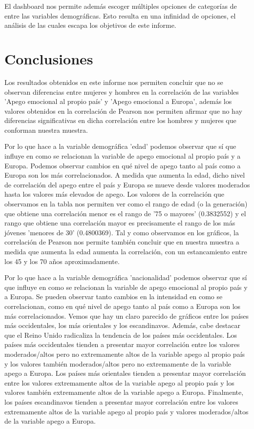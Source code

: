 \documentclass{article}
\begin{document}
\noindent El dashboard nos permite además escoger múltiples opciones de categorías de entre las variables demográficas. Esto resulta en una infinidad de opciones, el análisis de las cuales escapa los objetivos de este informe.

\section*{Conclusiones}

\noindent Los resultados obtenidos en este informe nos permiten concluir que no se observan diferencias entre mujeres y hombres en la correlación de las variables 'Apego emocional al propio país' y 'Apego emocional a Europa', además los valores obtenidos en la correlación de Pearson nos permiten afirmar que no hay diferencias significativas en dicha correlación entre los hombres y mujeres que conforman nuestra muestra.


\noindent Por lo que hace a la variable demográfica 'edad' podemos observar que sí que influye en como se relacionan la variable de apego emocional al propio país y a Europa. Podemos observar cambios en qué nivel de apego tanto al país como a Europa son los más correlacionados. A medida que aumenta la edad, dicho nivel de correlación del apego entre el país y Europa se mueve desde valores moderados hasta los valores más elevados de apego. Los valores de la correlación que observamos en la tabla nos permiten ver como el rango de edad (o la generación) que obtiene una correlación menor es el rango de '75 o mayores' (0.3832552) y el rango que obtiene una correlación mayor es precisamente el rango de los más jóvenes 'menores de 30' (0.4800369). Tal y como observamos en los gráficos, la correlación de Pearson nos permite también concluir que en nuestra muestra a medida que aumenta la edad aumenta la correlación, con un estancamiento entre los 45 y los 70 años aproximadamente.


\noindent Por lo que hace a la variable demográfica 'nacionalidad' podemos observar que sí que influye en como se relacionan la variable de apego emocional al propio país y a Europa. Se pueden observar tanto cambios en la intensidad en como se correlacionan, como en qué nivel de apego tanto al país como a Europa son los más correlacionados. Vemos que hay un claro parecido de gráficos entre los países más occidentales, los más orientales y los escandinavos. Además, cabe destacar que el Reino Unido radicaliza la tendencia de los países más occidentales. Los países más occidentales tienden a presentar mayor correlación entre los valores moderados/altos pero no extremamente altos de la variable apego al propio país y los valores también moderados/altos pero no extremamente de la variable apego a Europa. Los países más orientales tienden a presentar mayor correlación entre los valores extremamente altos de la variable apego al propio país y los valores también extremamente altos de la variable apego a Europa. Finalmente, los países escandinavos tienden a presentar mayor correlación entre los valores extremamente altos de la variable apego al propio país y valores moderados/altos de la variable apego a Europa.
\end{document}
